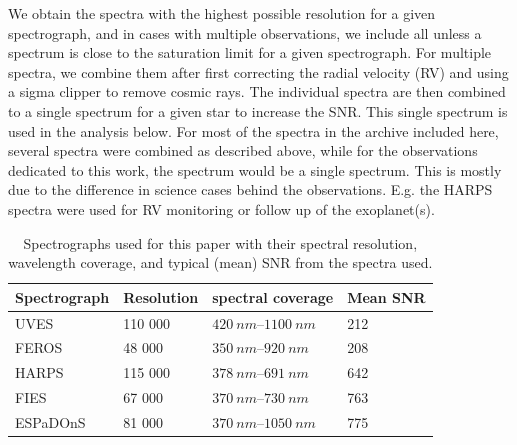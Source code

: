 \documentclass{aa}
\begin{document}
We obtain the spectra with the highest possible resolution for a given
spectrograph, and in cases with multiple observations, we include all unless a
spectrum is close to the saturation limit for a given spectrograph. For multiple
spectra, we combine them after first correcting the radial velocity (RV) and
using a sigma clipper to remove cosmic rays. The individual spectra are then
combined to a single spectrum for a given star to increase the SNR. This single
spectrum is used in the analysis below. For most of the spectra in the archive
included here, several spectra were combined as described above, while for the
observations dedicated to this work, the spectrum would be a single spectrum.
This is mostly due to the difference in science cases behind the observations.
E.g. the HARPS spectra were used for RV monitoring or follow up of the
exoplanet(s).

\begin{table}[htb!]
    \caption{Spectrographs used for this paper with their spectral resolution,
             wavelength coverage, and typical (mean) SNR from the spectra used.}
    \label{tab:instruments}
    \centering
    \begin{tabular}{llll}
      \hline\hline
      Spectrograph & Resolution & spectral coverage           &   Mean SNR  \\
      \hline
      UVES         &    110 000 & $\SIrange{420}{1100}{nm}$   &   212       \\
      FEROS        &     48 000 & $\SIrange{350}{920}{nm}$    &   208       \\
      HARPS        &    115 000 & $\SIrange{378}{691}{nm}$    &   642       \\
      FIES         &     67 000 & $\SIrange{370}{730}{nm}$    &   763       \\
      ESPaDOnS     &     81 000 & $\SIrange{370}{1050}{nm}$   &   775       \\
      \hline
    \end{tabular}
\end{table}
\end{document}
